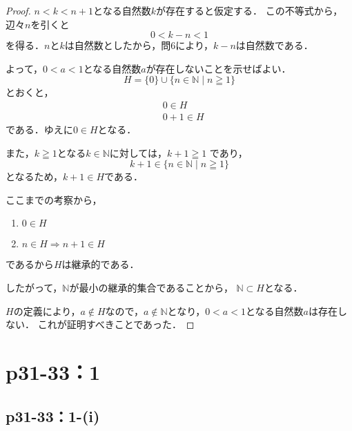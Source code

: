 \documentclass[a4paper,10pt,fleqn]{ltjsarticle}
\begin{document}
\begin{tleftbar}
	\begin{proof}
		$n < k < n+1$となる自然数$k$が存在すると仮定する．
        この不等式から，辺々$n$を引くと
		\[
        0 < k - n < 1 
        \]
		を得る．$n$と$k$は自然数としたから，問6により，$k-n$は自然数である．
        
        よって，$0<a<1$となる自然数$a$が存在しないことを示せばよい．
		\[
            H=\{0\} \cup \{n \in \mathbb{N} \mid n \geqq 1 \}
        \]
		とおくと，
		\begin{align*}
			&0 \in H \\
			&0+1 \in H
		\end{align*}
		である．ゆえに$ 0 \in H$となる．

		また，$k \geqq 1$となる$k \in \mathbb{N}$に対しては，$k +1 \geqq 1$
        であり，
        \[
        k+1 \in \{n \in \mathbb{N} \mid n \geqq 1 \} 
        \]
        となるため，$k+1 \in H$である．
        
        ここまでの考察から，
        \begin{enumerate}
            \item $0 \in H$
            \item $n \in H \Longrightarrow n+1 \in H$
        \end{enumerate}
         であるから$H$は継承的である．
         
         したがって，$\mathbb{N}$が最小の継承的集合であることから，
         $\mathbb{N} \subset H$となる．
        
		$H$の定義により，$a \notin H$なので，$a \notin \mathbb{N}$となり，$0<a<1$となる自然数$a$は存在しない．
        これが証明すべきことであった．
	\end{proof}
\end{tleftbar}

\newpage 

\section*{p31-33：1}


\subsection*{p31-33：1-(i)}
\end{document}
